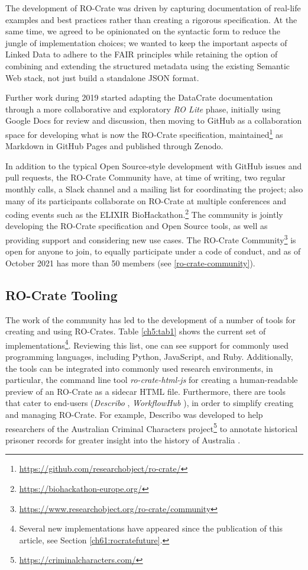 The development of RO-Crate was driven by capturing documentation of
real-life examples and best practices rather than creating a rigorous
specification. At the same time, we agreed to be opinionated on the
syntactic form to reduce the jungle of implementation choices; we wanted
to keep the important aspects of Linked Data to adhere to the FAIR
principles while retaining the option of combining and extending the
structured metadata using the existing Semantic Web stack, not just
build a standalone JSON format.

Further work during 2019 started adapting the DataCrate documentation
through a more collaborative and exploratory \emph{RO Lite} phase,
initially using Google Docs for review and discussion, then moving to
GitHub as a collaboration space for developing what is now the RO-Crate
specification, maintained\footnote{\url{https://github.com/researchobject/ro-crate/}} as
Markdown in GitHub Pages
and published through Zenodo.

In addition to the typical Open Source-style development with GitHub
issues and pull requests, the RO-Crate Community have, at time of
writing, two regular monthly calls, a Slack channel and a mailing list
for coordinating the project; also many of its participants collaborate
on RO-Crate at multiple conferences and coding events such as the
ELIXIR BioHackathon.\footnote{\url{https://biohackathon-europe.org/}} The community
is jointly developing the RO-Crate specification and Open Source tools,
as well as providing support and considering new use cases. The
RO-Crate Community\footnote{\url{https://www.researchobject.org/ro-crate/community}}
is open for anyone to join, to equally participate under a code of
conduct, and as of October 2021 has more than 50 members (see \vref{ro-crate-community}).

\subsection{RO-Crate Tooling}\label{ch5:tooling}

The work of the community has led to the development of a number of
tools for creating and using RO-Crates. Table \vref{ch5:tab1} shows the current set
of implementations\footnote{
  Several new implementations have appeared since the publication of this article, see Section \vref{ch61:rocratefuture}.
}. Reviewing this list, one can see support for
commonly used programming languages, including Python, JavaScript, and
Ruby. Additionally, the tools can be integrated into commonly used
research environments, in particular, the command line tool
\textit{ro-crate-html-js} \cite{ro-crate-html-js} for creating a human-readable
preview of an RO-Crate as a sidecar HTML file. Furthermore, there are
tools that cater to end-users (\textit{Describo} \cite{La Rosa 2021d}, \textit{WorkflowHub}
\cite{WorkflowHub 2023}), in order to simplify creating and managing
RO-Crate. For example, Describo was developed to help researchers of
the Australian Criminal Characters
project\footnote{\url{https://criminalcharacters.com/}} to annotate historical prisoner
records for greater insight into the history of Australia
\cite{Piper 2020}.

